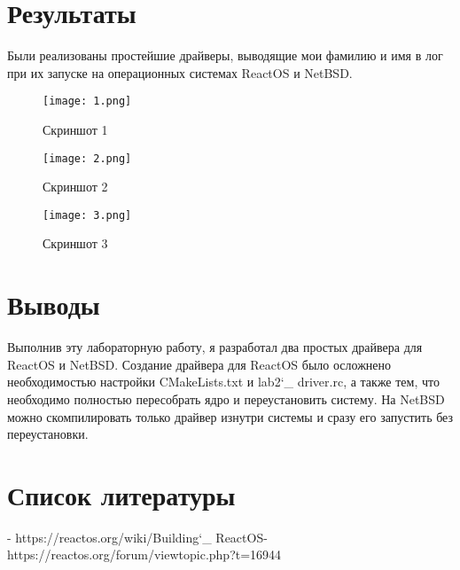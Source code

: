 \documentclass[a4paper, 14pt]{extarticle}
\begin{document}
\section{Результаты}
\begin{flushleft}
Были реализованы простейшие драйверы, выводящие мои фамилию и имя в лог при их запуске на операционных системах ReactOS и NetBSD. 

\begin{figure}[H]

\centering

\texttt{[image: 1.png]}

\caption{Скриншот 1}

\label{fig:mpr}

\end{figure}

\begin{figure}[H]

\centering

\texttt{[image: 2.png]}

\caption{Скриншот 2}

\label{fig:mpr}

\end{figure}

\begin{figure}[H]

\centering

\texttt{[image: 3.png]}

\caption{Скриншот 3}

\label{fig:mpr}

\end{figure}

\end{flushleft}
\pagebreak 

\section{Выводы}
Выполнив эту лабораторную работу, я разработал два простых драйвера для ReactOS и NetBSD. Создание драйвера для ReactOS было осложнено необходимостью настройки CMakeLists.txt и lab2\char`_ driver.rc, а также тем, что необходимо полностью пересобрать ядро и переустановить систему. На NetBSD можно скомпилировать только драйвер изнутри системы и сразу его запустить без переустановки.
\pagebreak

\section{Список литературы}
\begin{flushleft}
[1] - https://reactos.org/wiki/Building\char`_ ReactOS\newline
[2] - https://reactos.org/forum/viewtopic.php?t=16944\newline
\end{flushleft}
\end{document}
